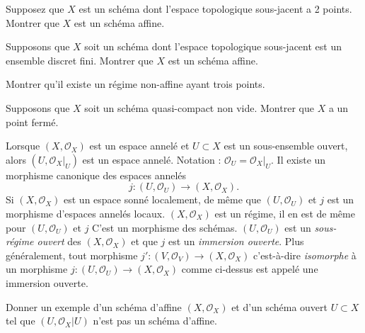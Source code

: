 \begin{exercise}
\label{exercise-two-points}
Supposez que $X$ est un schéma dont l'espace
topologique sous-jacent a 2 points. Montrer que $X$ est un schéma affine.
\end{exercise}

\begin{exercise}
\label{exercise-discrete-finite-set-points}
Supposons que $X$ soit un schéma dont l'espace topologique sous-jacent est un
ensemble discret fini. Montrer que $X$ est un schéma affine.
\end{exercise}

\begin{exercise}
\label{exercise-three-points}
Montrer qu'il existe un régime non-affine ayant trois points.
\end{exercise}

\begin{exercise}
\label{exercise-quasi-compact-closed-point}
Supposons que $X$ soit un schéma quasi-compact non vide. Montrer
que $X$ a un point fermé.
\end{exercise}

\begin{remark}
\label{remark-open-immersion}
Lorsque $(X, {\mathcal O}_X)$ est un espace annelé et $U \subset
X$ est un sous-ensemble ouvert, alors $(U, {\mathcal O}_X|_U)$ est un espace annelé.
Notation : ${\mathcal O}_U = {\mathcal O}_X|_U$. Il existe un morphisme canonique
des espaces annelés
$$
j : (U, {\mathcal O}_U) \longrightarrow (X, {\mathcal O}_X).
$$
Si $(X, {\mathcal O}_X)$ est un espace sonné localement, de
même que $(U, {\mathcal O}_U)$
et $j$ est un morphisme d'espaces annelés locaux. $(X, {\mathcal O}_X)$ est
un régime,
il en est de même pour $(U, {\mathcal O}_U)$ et $j$ C'est un
morphisme
des schémas. $(U, {\mathcal O}_U)$ est un {\it sous-régime ouvert} des $(X, {\mathcal
O}_X)$
et que $j$ est un {\it immersion ouverte}. Plus généralement, tout
morphisme $j' : (V, {\mathcal O}_V) \to (X, {\mathcal O}_X)$ c'est-à-dire {\it isomorphe} à
un
morphisme $j : (U, {\mathcal O}_U) \to (X, {\mathcal O}_X)$ comme ci-dessus est
appelé
une immersion ouverte.
\end{remark}

\begin{exercise}
\label{exercise-open-affine-not-affine}
Donner un exemple d'un schéma d'affine $(X, {\mathcal O}_X)$ et d'un
schéma ouvert $U \subset X$ tel que $(U, {\mathcal O}_X|U)$ n'est pas un schéma
d'affine.
\end{exercise}

